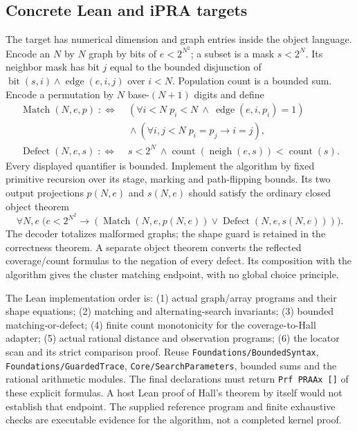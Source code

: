 \subsection{Concrete Lean and iPRA targets}

The target has numerical dimension and graph entries inside the object
language.  Encode an $N$ by $N$ graph by bits of $e<2^{N^2}$; a subset is a
mask $s<2^N$.  Its neighbor mask has bit $j$ equal to the bounded disjunction
of $\operatorname{bit}(s,i)\wedge\operatorname{edge}(e,i,j)$ over $i<N$.
Population count is a bounded sum.  Encode a permutation by $N$ base-$(N+1)$
digits and define
\[
\begin{split}
\operatorname{Match}(N,e,p)\;:\!\!\iff\;&
  (\forall i<N\; p_i<N\ \wedge\ \operatorname{edge}(e,i,p_i)=1)\\
 &{}\wedge(\forall i,j<N\;p_i=p_j\longrightarrow i=j),\\
\operatorname{Defect}(N,e,s)\;:\!\!\iff\;&
 s<2^N\ \wedge\operatorname{count}(\operatorname{neigh}(e,s))
                  <\operatorname{count}(s).
\end{split}
\]
Every displayed quantifier is bounded.  Implement the algorithm by fixed
primitive recursion over its stage, marking and path-flipping bounds.  Its
two output projections $p(N,e)$ and $s(N,e)$ should satisfy the ordinary
closed object theorem
\[
 \forall N,e\;\bigl(e<2^{N^2}\longrightarrow
    (\operatorname{Match}(N,e,p(N,e))
       \vee\operatorname{Defect}(N,e,s(N,e)))\bigr).
\]
The decoder totalizes malformed graphs; the shape guard is retained in the
correctness theorem.  A separate object theorem converts the reflected
coverage/count formulas to the negation of every defect.  Its composition
with the algorithm gives the cluster matching endpoint, with no global
choice principle.

The Lean implementation order is: (1) actual graph/array programs and
their shape equations; (2) matching and alternating-search invariants;
(3) bounded matching-or-defect; (4) finite count monotonicity for the
coverage-to-Hall adapter; (5) actual rational distance and observation
programs; (6) the locator scan and its strict comparison proof.  Reuse
\nolinkurl{Foundations/BoundedSyntax}, \nolinkurl{Foundations/GuardedTrace},
\nolinkurl{Core/SearchParameters}, bounded sums and the rational arithmetic
modules.  The final declarations must return
\texttt{Prf PRAAx []} of these explicit formulas.  A host Lean proof of
Hall's theorem by itself would not establish that endpoint.  The supplied
reference program and finite exhaustive checks are executable evidence for
the algorithm, not a completed kernel proof.
